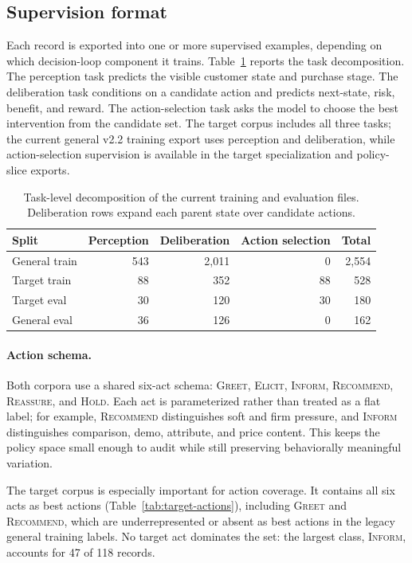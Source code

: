 \subsection{Supervision format}

Each record is exported into one or more supervised examples, depending on which decision-loop component it trains. Table~\ref{tab:task-counts} reports the task decomposition. The perception task predicts the visible customer state and purchase stage. The deliberation task conditions on a candidate action and predicts next-state, risk, benefit, and reward. The action-selection task asks the model to choose the best intervention from the candidate set. The target corpus includes all three tasks; the current general v2.2 training export uses perception and deliberation, while action-selection supervision is available in the target specialization and policy-slice exports.

\begin{table}[t]
\centering
\small
\begin{tabular}{lrrrr}
\toprule
Split & Perception & Deliberation & Action selection & Total \\
\midrule
General train & 543 & 2,011 & 0 & 2,554 \\
Target train & 88 & 352 & 88 & 528 \\
Target eval & 30 & 120 & 30 & 180 \\
General eval & 36 & 126 & 0 & 162 \\
\bottomrule
\end{tabular}
\caption{Task-level decomposition of the current training and evaluation files. Deliberation rows expand each parent state over candidate actions.}
\label{tab:task-counts}
\end{table}

\paragraph{Action schema.}
Both corpora use a shared six-act schema: \textsc{Greet}, \textsc{Elicit}, \textsc{Inform}, \textsc{Recommend}, \textsc{Reassure}, and \textsc{Hold}. Each act is parameterized rather than treated as a flat label; for example, \textsc{Recommend} distinguishes soft and firm pressure, and \textsc{Inform} distinguishes comparison, demo, attribute, and price content. This keeps the policy space small enough to audit while still preserving behaviorally meaningful variation.

The target corpus is especially important for action coverage. It contains all six acts as best actions (Table~\ref{tab:target-actions}), including \textsc{Greet} and \textsc{Recommend}, which are underrepresented or absent as best actions in the legacy general training labels. No target act dominates the set: the largest class, \textsc{Inform}, accounts for 47 of 118 records.


